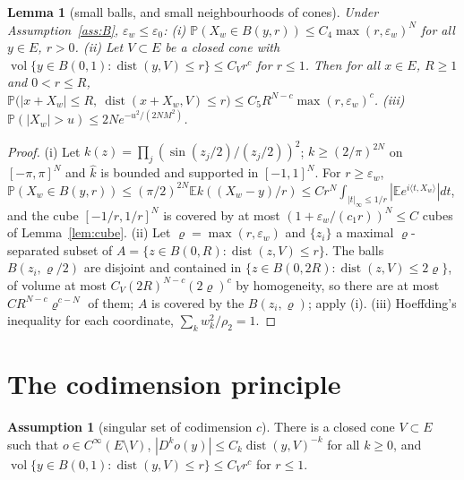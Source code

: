 \documentclass[10pt]{article}
\newtheorem{lemma}[theorem]{Lemma}
\theoremstyle{definition}
\newtheorem{assumption}{Assumption}
\theoremstyle{remark}
\newcommand{\E}{\mathbb{E}}
\newcommand{\Prob}{\mathbb{P}}
\newcommand{\inner}[2]{\langle #1, #2\rangle}
\newcommand{\dist}{\operatorname{dist}}
\newcommand{\vol}{\operatorname{vol}}
\newcommand{\ew}{\varepsilon_w}
\begin{document}
\begin{lemma}[small balls, and small neighbourhoods of cones]\label{lem:ball}
Under Assumption~\ref{ass:B}, $\ew\le\varepsilon_0$: (i) $\Prob(X_w\in B(y,r))\le C_4\max(r,\ew)^N$ for all $y\in E$, $r>0$.
(ii) Let $V\subset E$ be a closed cone with $\vol\{y\in B(0,1):\dist(y,V)\le r\}\le C_Vr^c$ for $r\le1$. Then for all
$x\in E$, $R\ge1$ and $0<r\le R$,
$\Prob\big(|x+X_w|\le R,\ \dist(x+X_w,V)\le r\big)\le C_5R^{N-c}\max(r,\ew)^c$. (iii) $\Prob(|X_w|>u)\le2Ne^{-u^2/(2NM^2)}$.
\end{lemma}
\begin{proof}
(i) Let $k(z)=\prod_j(\sin(z_j/2)/(z_j/2))^2$; $k\ge(2/\pi)^{2N}$ on $[-\pi,\pi]^N$ and $\widehat k$ is bounded and
supported in $[-1,1]^N$. For $r\ge\ew$,
$\Prob(X_w\in B(y,r))\le(\pi/2)^{2N}\E k((X_w-y)/r)\le Cr^N\int_{|t|_\infty\le1/r}|\E e^{i\inner t{X_w}}|dt$, and the cube
$[-1/r,1/r]^N$ is covered by at most $(1+\ew/(c_1r))^N\le C$ cubes of Lemma~\ref{lem:cube}. (ii) Let $\varrho=\max(r,\ew)$ and
$\{z_i\}$ a maximal $\varrho$-separated subset of $A=\{z\in B(0,R):\dist(z,V)\le r\}$. The balls $B(z_i,\varrho/2)$ are
disjoint and contained in $\{z\in B(0,2R):\dist(z,V)\le2\varrho\}$, of volume at most $C_V(2R)^{N-c}(2\varrho)^c$ by
homogeneity, so there are at most $CR^{N-c}\varrho^{c-N}$ of them; $A$ is covered by the $B(z_i,\varrho)$; apply (i).
(iii) Hoeffding's inequality for each coordinate, $\sum_kw_k^2/\rho_2=1$.
\end{proof}

\section{The codimension principle}\label{sec:codim}

\begin{assumption}[singular set of codimension $c$]\label{ass:R}
There is a closed cone $V\subset E$ such that $o\in C^\infty(E\setminus V)$,
$|D^ko(y)|\le C_k\dist(y,V)^{-k}$ for all $k\ge0$, and $\vol\{y\in B(0,1):\dist(y,V)\le r\}\le C_Vr^c$ for $r\le1$.
\end{assumption}
\end{document}
